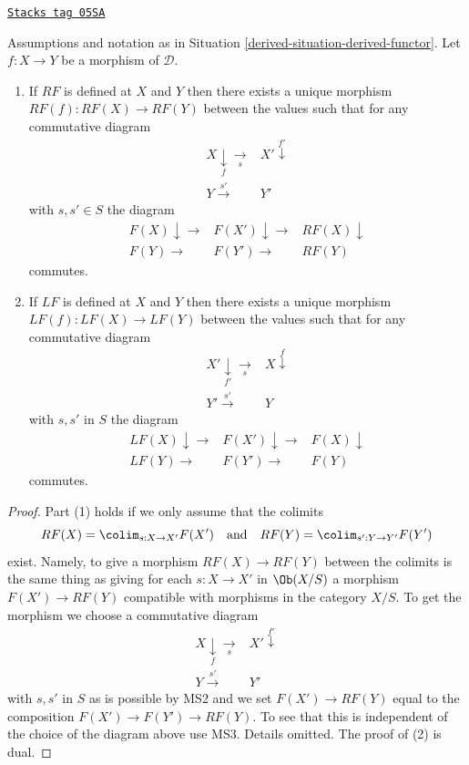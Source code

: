 \begin{lemma}
\label{derived-lemma-derived-functor}
\href{https://stacks.math.columbia.edu/tag/05SA}{\texttt{Stacks tag 05SA}}

Assumptions and notation as in
Situation \ref{derived-situation-derived-functor}.
Let $f : X \to Y$ be a morphism of $\mathcal{D}$.
\begin{enumerate}
\item If $RF$ is defined at $X$ and $Y$ then there exists a unique
morphism $RF(f) : RF(X) \to RF(Y)$ between the values such that
for any commutative diagram
$$
\begin{array}{cc}X \underset{f}{\downarrow}\underset{s}{\longrightarrow} & X' \overset{f'}{\downarrow} \\ Y \overset{s'}{\longrightarrow} & Y'\end{array}
$$
with $s, s' \in S$ the diagram
$$
\begin{array}{ccc}F(X) \downarrow\longrightarrow & F(X') \downarrow\longrightarrow & RF(X) \downarrow \\ F(Y) \longrightarrow & F(Y') \longrightarrow & RF(Y)\end{array}
$$
commutes.
\item If $LF$ is defined at $X$ and $Y$ then there exists a unique
morphism $LF(f) : LF(X) \to LF(Y)$ between the values such that
for any commutative diagram
$$
\begin{array}{cc}X' \underset{f'}{\downarrow}\underset{s}{\longrightarrow} & X \overset{f}{\downarrow} \\ Y' \overset{s'}{\longrightarrow} & Y\end{array}
$$
with $s, s'$ in $S$ the diagram
$$
\begin{array}{ccc}LF(X) \downarrow\longrightarrow & F(X') \downarrow\longrightarrow & F(X) \downarrow \\ LF(Y) \longrightarrow & F(Y') \longrightarrow & F(Y)\end{array}
$$
commutes.
\end{enumerate}
\end{lemma}

\begin{proof}
Part (1) holds if we only assume that the colimits
$$
RF(X) = \colim_{s : X \to X'} F(X')
\quad\text{and}\quad
RF(Y) = \colim_{s' : Y \to Y'} F(Y')
$$
exist. Namely, to give a morphism $RF(X) \to RF(Y)$ between the colimits
is the same thing as giving for each $s : X \to X'$ in $\Ob(X/S)$
a morphism $F(X') \to RF(Y)$ compatible with morphisms in the category
$X/S$. To get the morphism we choose a commutative diagram
$$
\begin{array}{cc}X \underset{f}{\downarrow}\underset{s}{\longrightarrow} & X' \overset{f'}{\downarrow} \\ Y \overset{s'}{\longrightarrow} & Y'\end{array}
$$
with $s, s'$ in $S$ as is possible by MS2 and we set
$F(X') \to RF(Y)$ equal to the composition $F(X') \to F(Y') \to RF(Y)$.
To see that this is independent of the choice of the diagram above use
MS3. Details omitted. The proof of (2) is dual.
\end{proof}

